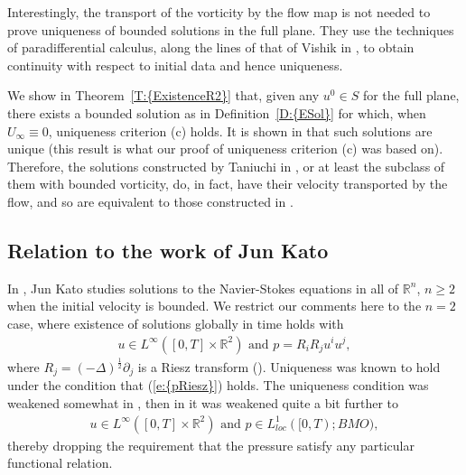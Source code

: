 \documentclass[reqno,openright,11pt,twoside]{amsart}
\theoremstyle{definition}
\numberwithin{equation}{section}
\begin{document}
Interestingly, the transport of the vorticity by the flow map is not needed to prove uniqueness of bounded solutions in the full plane. They use the techniques of paradifferential calculus, along the lines of that of Vishik in \cite{VishikBesov}, to obtain continuity with respect to initial data and hence uniqueness.

We show in {Theorem~\ref{T:{ExistenceR2}}} that, given any $u^0 \in S$ for the full plane, there exists a bounded solution as in {Definition~\ref{D:{ESol}}} for which, when $U_{\ensuremath{\infty}} \equiv 0$, uniqueness criterion (c) holds. It is shown in \cite{TaniuchiEtAl2010} that such solutions are unique (this result is what our proof of uniqueness criterion (c) was based on). Therefore, the solutions constructed by Taniuchi in \cite{Taniuchi2004}, or at least the subclass of them with bounded vorticity, do, in fact, have their velocity transported by the flow, and so are equivalent to those constructed in \cite{AKLL2014}.

\subsection{Relation to the work of Jun Kato}\label{S:JunKato}

\noindent In \cite{JunKato2003}, Jun Kato studies solutions to the Navier-Stokes equations in all of ${\ensuremath{{\ensuremath{\mathbb{{R}}}}}}^n$, $n \ge 2$ when the initial velocity is bounded. We restrict our comments here to the $n = 2$ case, where existence of solutions globally in time holds with\begin{align}\label{e:pRiesz}
    u \in L^{\ensuremath{\infty}}([0, T] \times {\ensuremath{{\ensuremath{\mathbb{{R}}}}}}^2)
        \text{ and }
    p
        = R_i R_j u^i u^j,
\end{align}
where $R_j = (-\Delta)^{\frac{1}{2}} {\ensuremath{\partial}}_j$ is a Riesz transform (\cite{CannonKnightly1970, Knightly1972, Cannone1995, GKM1999, GMS2001}).
Uniqueness was known to hold under the condition that {(\ref{e:{pRiesz}})} holds. The uniqueness condition was weakened somewhat in \cite{GKKM2001}, then in \cite{JunKato2003} it was weakened quite a bit further to
\begin{align}\label{e:pRiesz2}
    u \in L^{\ensuremath{\infty}}([0, T] \times {\ensuremath{{\ensuremath{\mathbb{{R}}}}}}^2)
        \text{ and }
    p
        \in L^1_{loc}([0, T); BMO),
\end{align}
thereby dropping the requirement that the pressure satisfy any particular functional relation.
\end{document}

